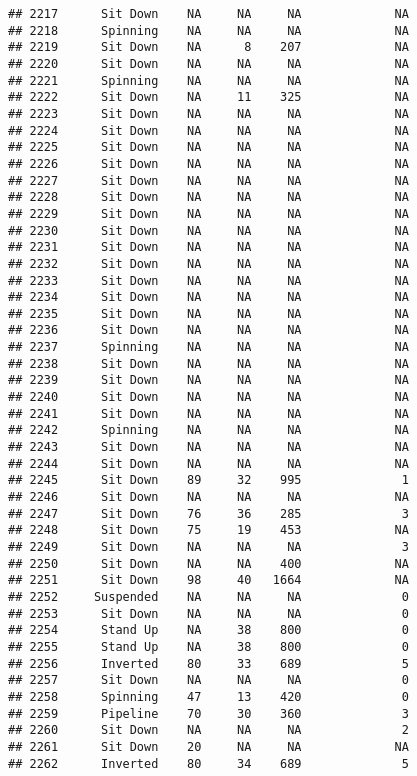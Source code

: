 \documentclass[
]{article}
\begin{document}
\begin{verbatim}
## 2217      Sit Down    NA     NA     NA             NA
## 2218      Spinning    NA     NA     NA             NA
## 2219      Sit Down    NA      8    207             NA
## 2220      Sit Down    NA     NA     NA             NA
## 2221      Spinning    NA     NA     NA             NA
## 2222      Sit Down    NA     11    325             NA
## 2223      Sit Down    NA     NA     NA             NA
## 2224      Sit Down    NA     NA     NA             NA
## 2225      Sit Down    NA     NA     NA             NA
## 2226      Sit Down    NA     NA     NA             NA
## 2227      Sit Down    NA     NA     NA             NA
## 2228      Sit Down    NA     NA     NA             NA
## 2229      Sit Down    NA     NA     NA             NA
## 2230      Sit Down    NA     NA     NA             NA
## 2231      Sit Down    NA     NA     NA             NA
## 2232      Sit Down    NA     NA     NA             NA
## 2233      Sit Down    NA     NA     NA             NA
## 2234      Sit Down    NA     NA     NA             NA
## 2235      Sit Down    NA     NA     NA             NA
## 2236      Sit Down    NA     NA     NA             NA
## 2237      Spinning    NA     NA     NA             NA
## 2238      Sit Down    NA     NA     NA             NA
## 2239      Sit Down    NA     NA     NA             NA
## 2240      Sit Down    NA     NA     NA             NA
## 2241      Sit Down    NA     NA     NA             NA
## 2242      Spinning    NA     NA     NA             NA
## 2243      Sit Down    NA     NA     NA             NA
## 2244      Sit Down    NA     NA     NA             NA
## 2245      Sit Down    89     32    995              1
## 2246      Sit Down    NA     NA     NA             NA
## 2247      Sit Down    76     36    285              3
## 2248      Sit Down    75     19    453             NA
## 2249      Sit Down    NA     NA     NA              3
## 2250      Sit Down    NA     NA    400             NA
## 2251      Sit Down    98     40   1664             NA
## 2252     Suspended    NA     NA     NA              0
## 2253      Sit Down    NA     NA     NA              0
## 2254      Stand Up    NA     38    800              0
## 2255      Stand Up    NA     38    800              0
## 2256      Inverted    80     33    689              5
## 2257      Sit Down    NA     NA     NA              0
## 2258      Spinning    47     13    420              0
## 2259      Pipeline    70     30    360              3
## 2260      Sit Down    NA     NA     NA              2
## 2261      Sit Down    20     NA     NA             NA
## 2262      Inverted    80     34    689              5

\end{verbatim}
\end{document}
